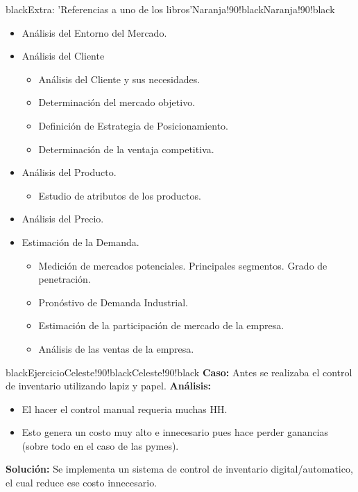 \documentclass{templateNote}
\begin{document}
\begin{CuadroPersonalizado}{black}{Extra: 'Referencias a uno de los libros'}{Naranja!90!black}{Naranja!90!black}
  \begin{itemize}
    \item Análisis del Entorno del Mercado.
    \item Análisis del Cliente
    \begin{itemize}
      \item Análisis del Cliente y sus necesidades.
      \item Determinación del mercado objetivo.
      \item Definición de Estrategia de Posicionamiento.
      \item Determinación de la ventaja competitiva.
    \end{itemize}
    \item Análisis del Producto.
    \begin{itemize}
      \item Estudio de atributos de los productos.
    \end{itemize}
    \item Análisis del Precio.
    \item Estimación de la Demanda.
    \begin{itemize}
      \item Medición de mercados potenciales. Principales segmentos. Grado de penetración.
      \item Pronóstivo de Demanda Industrial.
      \item Estimación de la participación de mercado de la empresa.
      \item Análisis de las ventas de la empresa.
    \end{itemize}
  \end{itemize}
\end{CuadroPersonalizado}

\begin{CuadroPersonalizado}{black}{Ejercicio}{Celeste!90!black}{Celeste!90!black}
  \textbf{Caso:} Antes se realizaba el control de inventario utilizando lapiz y papel.
  \newline
  \textbf{Análisis:}
  \begin{itemize}
    \item El hacer el control manual requeria muchas HH.
    \item Esto genera un costo muy alto e innecesario pues hace perder ganancias (sobre todo en el caso de las pymes).
  \end{itemize}
  \textbf{Solución:} Se implementa un sistema de control de inventario digital/automatico, el cual reduce ese costo innecesario.
\end{CuadroPersonalizado}
\end{document}
